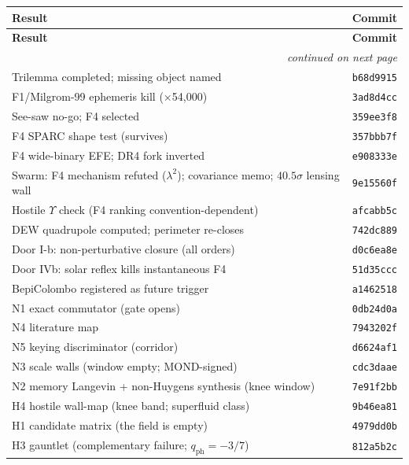 \documentclass[11pt,a4paper]{article}
\begin{document}
\begin{longtable}{@{}p{11.5cm} l@{}}
\toprule
\textbf{Result} & \textbf{Commit} \\
\midrule
\endfirsthead
\toprule
\textbf{Result} & \textbf{Commit} \\
\midrule
\endhead
\midrule \multicolumn{2}{r}{\emph{continued on next page}} \\
\endfoot
\bottomrule
\endlastfoot
Trilemma completed; missing object named & \texttt{b68d9915} \\
\addlinespace
F1/Milgrom-99 ephemeris kill ($\times$54,000) & \texttt{3ad8d4cc} \\
\addlinespace
See-saw no-go; F4 selected & \texttt{359ee3f8} \\
\addlinespace
F4 SPARC shape test (survives) & \texttt{357bbb7f} \\
\addlinespace
F4 wide-binary EFE; DR4 fork inverted & \texttt{e908333e} \\
\addlinespace
Swarm: F4 mechanism refuted ($\lambda^{2}$); covariance memo; $40.5\sigma$ lensing wall & \texttt{9e15560f} \\
\addlinespace
Hostile $\Upsilon$ check (F4 ranking convention-dependent) & \texttt{afcabb5c} \\
\addlinespace
DEW quadrupole computed; perimeter re-closes & \texttt{742dc889} \\
\addlinespace
Door I-b: non-perturbative closure (all orders) & \texttt{d0c6ea8e} \\
\addlinespace
Door IVb: solar reflex kills instantaneous F4 & \texttt{51d35ccc} \\
\addlinespace
BepiColombo registered as future trigger & \texttt{a1462518} \\
\addlinespace
N1 exact commutator (gate opens) & \texttt{0db24d0a} \\
\addlinespace
N4 literature map & \texttt{7943202f} \\
\addlinespace
N5 keying discriminator (corridor) & \texttt{d6624af1} \\
\addlinespace
N3 scale walls (window empty; MOND-signed) & \texttt{cdc3daae} \\
\addlinespace
N2 memory Langevin + non-Huygens synthesis (knee window) & \texttt{7e91f2bb} \\
\addlinespace
H4 hostile wall-map (knee band; superfluid class) & \texttt{9b46ea81} \\
\addlinespace
H1 candidate matrix (the field is empty) & \texttt{4979dd0b} \\
\addlinespace
H3 gauntlet (complementary failure; $q_{\mathrm{ph}} = -3/7$) & \texttt{812a5b2c} \\

\end{longtable}
\end{document}

